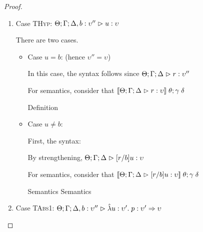 \begin{proof}
\begin{enumerate}
\item Case \textsc{THyp}: $\judgeA[\Theta; \Gamma; \Delta, b:\upsilon'']{u}{\upsilon}$

  There are two cases. 
  \begin{itemize}
  \item Case $u = b$: (hence $\upsilon'' = \upsilon$)

    In this case, the syntax follows since $\judgeA{r}{\upsilon''}$

    For semantics, consider that $\interp{\judgeA[\Theta; \Gamma; \Delta]{r}{\upsilon}}\;\theta;\gamma\;\delta$
    \begin{eqnproof}
          {Definition}
    \end{eqnproof}

  \item Case $u \not= b$: 

  First, the syntax:
  \begin{tabbedproof}
  \oo By strengthening, $\judgeA[\Theta; \Gamma; \Delta]{[r/b]u}{\upsilon}$ \\
  \end{tabbedproof}

  For semantics, consider that $\interp{\judgeA[\Theta; \Gamma; \Delta]{[r/b]u}{\upsilon}}\;\theta;\gamma\;\delta$ \\
  \begin{eqnproof}
          {Semantics} 
          {Semantics}
  \end{eqnproof}

  \end{itemize}




\item Case \textsc{TAbs1}: $\judgeA[\Theta; \Gamma; \Delta, b:\upsilon'']{\pfun{u}{\upsilon'}{p}}{\upsilon' \To \upsilon}$
  

\end{enumerate}
\end{proof}
